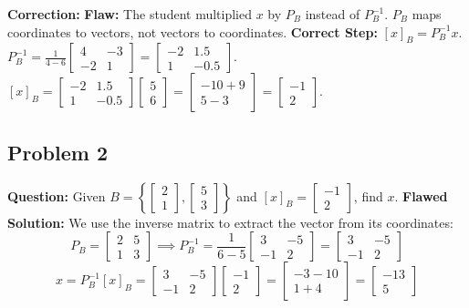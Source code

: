 \documentclass[11pt]{article}
\begin{document}
\textbf{Correction:}
\textbf{Flaw:} The student multiplied $x$ by $P_B$ instead of $P_B^{-1}$. $P_B$ maps coordinates to vectors, not vectors to coordinates.
\textbf{Correct Step:} $[x]_B = P_B^{-1} x$. 
$P_B^{-1} = \frac{1}{4-6} \begin{bmatrix} 4 & -3 \\ -2 & 1 \end{bmatrix} = \begin{bmatrix} -2 & 1.5 \\ 1 & -0.5 \end{bmatrix}$.
$[x]_B = \begin{bmatrix} -2 & 1.5 \\ 1 & -0.5 \end{bmatrix} \begin{bmatrix} 5 \\ 6 \end{bmatrix} = \begin{bmatrix} -10 + 9 \\ 5 - 3 \end{bmatrix} = \begin{bmatrix} -1 \\ 2 \end{bmatrix}$.

\subsection{Problem 2}
\textbf{Question:} Given $B = \left\{ \begin{bmatrix} 2 \\ 1 \end{bmatrix}, \begin{bmatrix} 5 \\ 3 \end{bmatrix} \right\}$ and $[x]_B = \begin{bmatrix} -1 \\ 2 \end{bmatrix}$, find $x$.
\textbf{Flawed Solution:}
We use the inverse matrix to extract the vector from its coordinates:
\[ P_B = \begin{bmatrix} 2 & 5 \\ 1 & 3 \end{bmatrix} \implies P_B^{-1} = \frac{1}{6-5} \begin{bmatrix} 3 & -5 \\ -1 & 2 \end{bmatrix} = \begin{bmatrix} 3 & -5 \\ -1 & 2 \end{bmatrix} \]
\[ x = P_B^{-1} [x]_B = \begin{bmatrix} 3 & -5 \\ -1 & 2 \end{bmatrix} \begin{bmatrix} -1 \\ 2 \end{bmatrix} = \begin{bmatrix} -3 - 10 \\ 1 + 4 \end{bmatrix} = \begin{bmatrix} -13 \\ 5 \end{bmatrix} \]
\end{document}

